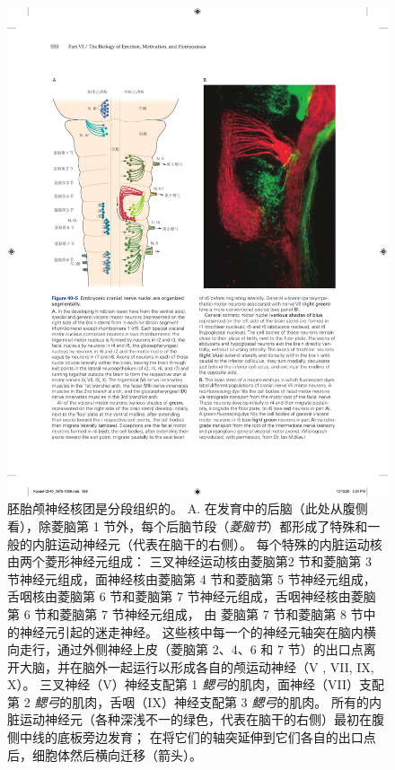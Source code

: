 \begin{figure}[htbp]
	\centering
	\includegraphics[width=1.0\linewidth]{chap40/fig_40_5}
	\caption{胚胎颅神经核团是分段组织的。
		A. 在发育中的后脑（此处从腹侧看），除菱脑第 1 节外，每个后脑节段（\textit{菱脑节}）都形成了特殊和一般的内脏运动神经元（代表在脑干的右侧）。
		每个特殊的内脏运动核由两个菱形神经元组成：
		三叉神经运动核由菱脑第2 节和菱脑第 3 节神经元组成，面神经核由菱脑第 4 节和菱脑第 5 节神经元组成，舌咽核由菱脑第 6 节和菱脑第 7 节神经元组成，舌咽神经核由菱脑第 6 节和菱脑第 7 节神经元组成， 由 菱脑第 7 节和菱脑第 8 节中的神经元引起的迷走神经。
		这些核中每一个的神经元轴突在脑内横向走行，通过外侧神经上皮（菱脑第 2、4、6 和 7 节）的出口点离开大脑，并在脑外一起运行以形成各自的颅运动神经（V , VII, IX, X）。
		三叉神经（V）神经支配第 1 \textit{鳃弓}的肌肉，面神经（VII）支配第 2 \textit{鳃弓}的肌肉，舌咽（IX）神经支配第 3 \textit{鳃弓}的肌肉。
		所有的内脏运动神经元（各种深浅不一的绿色，代表在脑干的右侧）最初在腹侧中线的底板旁边发育； 
		在将它们的轴突延伸到它们各自的出口点后，细胞体然后横向迁移（箭头）。
}
\end{figure}
